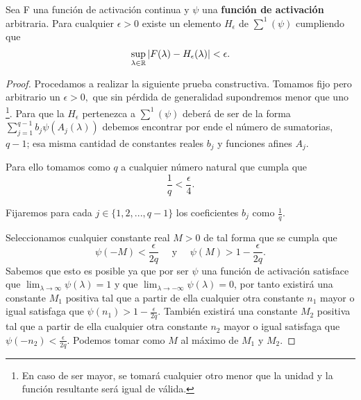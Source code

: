 \begin{lema}\label{lema:a_2_paso_previo_denso}
    Sea F una función de activación continua y $\psi$ una \textbf{función de activación} arbitraria. 
    Para cualquier $\epsilon > 0$ existe un elemento $H_{\epsilon}$ de $\sum^1(\psi)$ cumpliendo que
    \begin{equation}
        \sup_{\lambda \in \mathbb{R}} | F(\lambda) - H_{\epsilon}(\lambda) | < \epsilon.
    \end{equation}
\end{lema} 
\begin{proof}
    Procedamos a realizar la siguiente prueba constructiva. 
    Tomamos fijo pero arbitrario un $\epsilon > 0,$ que sin pérdida de generalidad
    supondremos menor que uno 
    \footnote{En caso de ser mayor, se tomará cualquier otro menor que la unidad y la función resultante será igual de válida.}.
    Para que la $H_\epsilon$ pertenezca a $\sum ^1 (\psi)$ deberá de ser de la 
    forma $\sum^{q-1}_{j=1} b_j \psi( A_j(\lambda))$
    debemos encontrar por ende el número de sumatorias, $q-1$; esa misma cantidad de constantes reales $b_j$ y funciones afines $A_j$. 
    

    Para ello tomamos como $q$ a cualquier número natural que cumpla que 
    \begin{equation}\label{eq:lema_a_2_def_q}
        \frac{1}{q} < \frac{\epsilon}{4}.
    \end{equation}

    Fijaremos para cada $j \in \{1,2, ...,q-1\}$ los coeficientes  $b_j$ como $\frac{1}{q}$. 

    Seleccionamos cualquier constante real $M>0$ de tal forma que 
    se cumpla que
    \begin{equation}\label{lema_a_2_psi_m}
        \psi(-M) < \frac{\epsilon}{2q}
        \quad \text{ y } \quad
        \psi(M) > 1 - \frac{\epsilon}{2q}.
    \end{equation} 
    Sabemos que esto es posible ya que por ser $\psi$ una función de activación satisface que 
    $\lim_{\lambda \longrightarrow \infty} \psi(\lambda) = 1$ y que  $\lim_{\lambda \longrightarrow -\infty} \psi(\lambda) = 0$,
    por tanto existirá una constante $M_1$ positiva tal que a partir de ella cualquier otra constante $n_1$ mayor o igual satisfaga que 
    $\psi(n_1) > 1 - \frac{\epsilon}{2q}$. También existirá una constante $M_2$ positiva tal que a partir de ella cualquier otra constante $n_2$ mayor o igual satisfaga que 
    $\psi(-n_2) < \frac{\epsilon}{2q}$. Podemos tomar como $M$ al máximo de $M_1$ y $M_2$.   


\end{proof}
